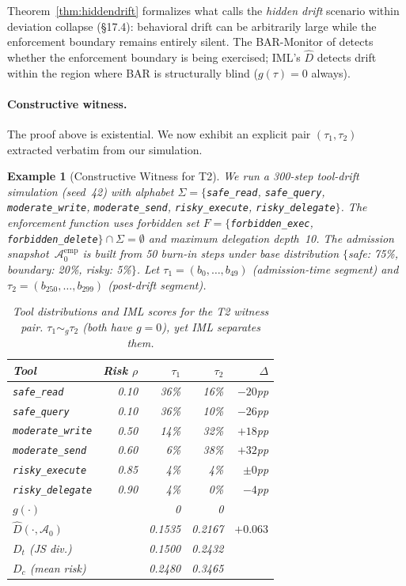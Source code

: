 \documentclass[11pt]{article}
\newtheorem{example}{Example}[section]
\newcommand{\Azero}{\mathcal{A}_0}
\newcommand{\Dhat}{\widehat{D}}
\begin{document}
\noindent
Theorem~\ref{thm:hiddendrift} formalizes what \citet{fernandez2026acp}
calls the \emph{hidden drift} scenario within deviation collapse (\S17.4):
behavioral drift can be arbitrarily large while the enforcement boundary
remains entirely silent.  The BAR-Monitor of \citet{fernandez2026acp}
detects whether the enforcement boundary is being exercised; IML's $\Dhat$
detects drift within the region where BAR is structurally blind
($g(\tau) = 0$ always).

\paragraph{Constructive witness.}
The proof above is existential.  We now exhibit an explicit pair
$(\tau_1, \tau_2)$ extracted verbatim from our simulation.

\begin{example}[Constructive Witness for T2]
\label{ex:t2}
We run a 300-step \emph{tool-drift} simulation (seed~42) with alphabet
$\Sigma = \{$\texttt{safe\_read}, \texttt{safe\_query}, \texttt{moderate\_write},
\texttt{moderate\_send}, \texttt{risky\_execute}, \texttt{risky\_delegate}$\}$.
The enforcement function uses forbidden set
$F = \{$\texttt{forbidden\_exec}, \texttt{forbidden\_delete}$\} \cap \Sigma = \emptyset$
and maximum delegation depth~10.
The admission snapshot~$\Azero^{\mathrm{emp}}$ is built from 50 burn-in steps
under base distribution $\{$safe: 75\%, boundary: 20\%, risky: 5\%$\}$.
Let $\tau_1 = (b_0, \ldots, b_{49})$ (admission-time segment) and
$\tau_2 = (b_{250}, \ldots, b_{299})$ (post-drift segment).

\begin{table}[h]
\centering
\caption{Tool distributions and IML scores for the T2 witness pair.
         $\tau_1 \sim_g \tau_2$ (both have $g=0$), yet IML separates them.}
\label{tab:witness}
\small
\begin{tabular}{@{}lrrrr@{}}
\toprule
Tool & Risk $\rho$ & $\tau_1$ & $\tau_2$ & $\Delta$ \\
\midrule
\texttt{safe\_read}      & 0.10 & 36\% & 16\% & $-20$pp \\
\texttt{safe\_query}     & 0.10 & 36\% & 10\% & $-26$pp \\
\texttt{moderate\_write} & 0.50 & 14\% & 32\% & $+18$pp \\
\texttt{moderate\_send}  & 0.60 &  6\% & 38\% & $+32$pp \\
\texttt{risky\_execute}  & 0.85 &  4\% &  4\% & $\pm 0$pp \\
\texttt{risky\_delegate} & 0.90 &  4\% &  0\% & $-4$pp \\
\midrule
$g(\cdot)$               & & 0 & 0 & \\
$\Dhat(\cdot, \Azero)$   & & 0.1535 & 0.2167 & $\mathbf{+0.063}$ \\
$D_t$ (JS div.)          & & 0.1500 & 0.2432 & \\
$D_c$ (mean risk)        & & 0.2480 & 0.3465 & \\
\bottomrule
\end{tabular}
\end{table}


\end{example}
\end{document}
